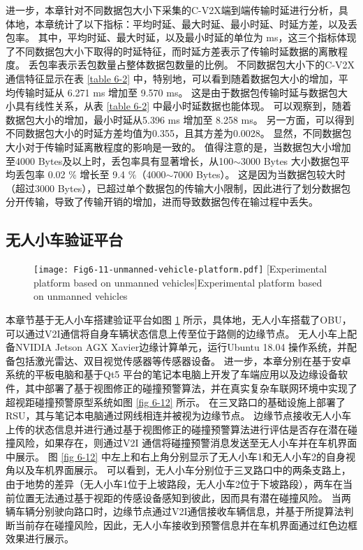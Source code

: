 进一步，本章针对不同数据包大小下采集的C-V2X端到端传输时延进行分析，具体地，本章统计了以下指标：平均时延、最大时延、最小时延、时延方差，以及丢包率。
其中，平均时延、最大时延，以及最小时延的单位为 ms，这三个指标体现了不同数据包大小下取得的时延特征，而时延方差表示了传输时延数据的离散程度。
丢包率表示丢包数量占整体数据包数量的比例。
不同数据包大小下的C-V2X通信特征显示在表 \ref{table 6-2} 中，特别地，可以看到随着数据包大小的增加，平均传输时延从 6.271 ms 增加至 9.570 ms。
这是由于数据包传输时延与数据包大小具有线性关系，从表 \ref{table 6-2} 中最小时延数据也能体现。
可以观察到，随着数据包大小的增加，最小时延从5.396 ms 增加至 8.258 ms。
另一方面，可以得到不同数据包大小的时延方差均值为0.355，且其方差为0.0028。
显然，不同数据包大小对于传输时延离散程度的影响是一致的。
值得注意的是，当数据包大小增加至4000 Bytes及以上时，丢包率具有显著增长，从100$\sim$3000 Bytes 大小数据包平均丢包率 0.02 \% 增长至 9.4 \%（4000$\sim$7000 Bytes）。
这是因为当数据包较大时（超过3000 Bytes），已超过单个数据包的传输大小限制，因此进行了划分数据包分开传输，导致了传输开销的增加，进而导致数据包传在输过程中丢失。

\subsection{无人小车验证平台}

\begin{figure}[h]
\centering
  \texttt{[image: Fig6-11-unmanned-vehicle-platform.pdf]}
  [Experimental platform based on unmanned vehicles]{Experimental platform based on unmanned vehicles}
  \label{fig 6-11}
\end{figure}

本章节基于无人小车搭建验证平台如图 \ref{fig 6-11} 所示，具体地，无人小车搭载了OBU，可以通过V2I通信将自身车辆状态信息上传至位于路侧的边缘节点。
无人小车上配备NVIDIA Jetson AGX Xavier边缘计算单元，运行Ubuntu 18.04 操作系统，并配备包括激光雷达、双目视觉传感器等传感器设备。
进一步，本章分别在基于安卓系统的平板电脑和基于Qt5 平台的笔记本电脑上开发了车端应用以及边缘设备软件，其中部署了基于视图修正的碰撞预警算法，并在真实复杂车联网环境中实现了超视距碰撞预警原型系统如图 \ref{fig 6-12} 所示。
在三叉路口的基础设施上部署了RSU，其与笔记本电脑通过网线相连并被视为边缘节点。
边缘节点接收无人小车上传的状态信息并进行通过基于视图修正的碰撞预警算法进行评估是否存在潜在碰撞风险，如果存在，则通过V2I 通信将碰撞预警消息发送至无人小车并在车机界面中展示。
图 \ref{fig 6-12} 中左上和右上角分别显示了无人小车1和无人小车2的自身视角以及车机界面展示。
可以看到，无人小车分别位于三叉路口中的两条支路上，由于地势的差异（无人小车1位于上坡路段，无人小车2位于下坡路段），两车在当前位置无法通过基于视距的传感设备感知到彼此，因而具有潜在碰撞风险。
当两辆车辆分别驶向路口时，边缘节点通过V2I通信接收车辆信息，并基于所提算法判断当前存在碰撞风险，因此，无人小车接收到预警信息并在车机界面通过红色边框效果进行展示。

